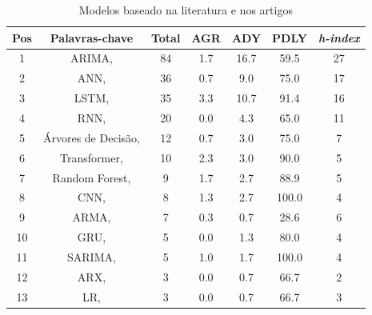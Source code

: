 %
%

\begin{table}[htb]
	\centering
	\caption{Modelos baseado na literatura e nos artigos}\label{tb:mode}
	\begin{tabular}{ccccccc}
		\toprule
		Pos & Palavras-chave & Total & AGR & ADY & PDLY & \textit{h-index} \\
		\midrule
		1 & ARIMA, \citeonline{2-s2.0-85069459067} & 84 & 1.7 & 16.7 & 59.5 & 27 \\
		2 & ANN, \citeonline{2-s2.0-85054695177} & 36 & 0.7 & 9.0 & 75.0 & 17 \\
		3 & LSTM, \citeonline{WOS:000529902300014} & 35 & 3.3 & 10.7 & 91.4 & 16 \\
		4 & RNN, \citeonline{2-s2.0-85067419084} & 20 & 0.0 & 4.3 & 65.0 & 11 \\
		5 & Árvores de Decisão, \citeonline{2-s2.0-85054695177} & 12 & 0.7 & 3.0 & 75.0 & 7 \\
		6 & Transformer, \citeonline{2-s2.0-85045193200} & 10 & 2.3 & 3.0 & 90.0 & 5 \\
		7 & Random Forest, \citeonline{2-s2.0-85135210428} & 9 & 1.7 & 2.7 & 88.9 & 5 \\
		8 & CNN, \citeonline{WOS:000841076700002} & 8 & 1.3 & 2.7 & 100.0 & 4 \\
		9 & ARMA, \citeonline{2-s2.0-85038637324} & 7 & 0.3 & 0.7 & 28.6 & 6 \\
		10 & GRU, \citeonline{2-s2.0-85135210428} & 5 & 0.0 & 1.3 & 80.0 & 4 \\
		11 & SARIMA, \citeonline{2-s2.0-85128561644} & 5 & 1.0 & 1.7 & 100.0 & 4 \\
		12 & ARX, \citeonline{2-s2.0-85051469381} & 3 & 0.0 & 0.7 & 66.7 & 2 \\
		13 & LR, \citeonline{2-s2.0-85125426780} & 3 & 0.0 & 0.7 & 66.7 & 3 \\

\end{tabular}
\end{table}
